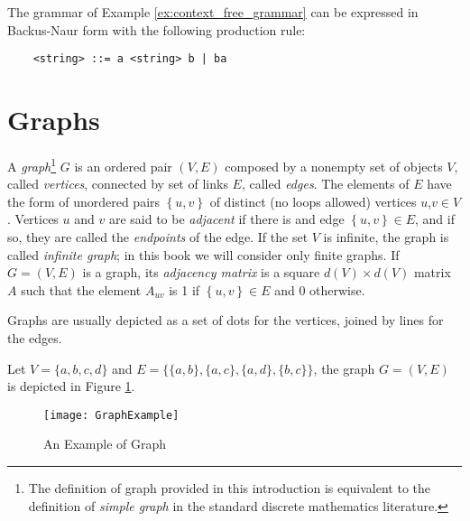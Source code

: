 \begin{example}
The grammar of Example \ref{ex:context_free_grammar} can be expressed in Backus-Naur form with the following production rule:
\begin{verbatim}
    <string> ::= a <string> b | ba
\end{verbatim}
\end{example}

%
%

\section{Graphs}
\label{sec:Graphs}

A \emph{graph}\footnote{The definition of graph provided in this introduction is equivalent to the definition of \emph{simple graph} in the standard discrete mathematics literature.} $G$ is an ordered pair $(V,E)$ composed by a nonempty set of objects $V$, called \emph{vertices}, connected by set of links $E$, called \emph{edges}. The elements of $E$ have the form of unordered pairs $\left\{ u,v\right\}$ of distinct (no loops allowed) vertices $u$,$v\in V$. Vertices $u$ and $v$ are said to be \emph{adjacent} if there is and edge $\left\{ u,v\right\} \in E$, and if so, they are called the \emph{endpoints} of the edge. If the set $V$ is infinite, the graph is called \emph{infinite graph}; in this book we will consider only finite graphs. If $G = (V,E)$ is a graph, its \emph{adjacency matrix} is a square $d(V) \times d(V)$ matrix $A$ such that the element $A_{uv}$ is 1 if $\left\{ u,v\right\} \in E$ and 0 otherwise.

Graphs are usually depicted as a set of dots for the vertices, joined by lines for the edges.

\begin{example}
\label{ex:binary_tree}
Let $V=\{a, b, c, d\}$ and $E=\{ \{a,b\}, \{a,c\}, \{a,d\}, \{b,c\} \}$, the graph $G=(V,E)$ is depicted in Figure \ref{fig:Graph-Example}.
\end{example}

\begin{figure}[h]
\centering\texttt{[image: GraphExample]}
\caption{\label{fig:Graph-Example}An Example of Graph}
\end{figure}

